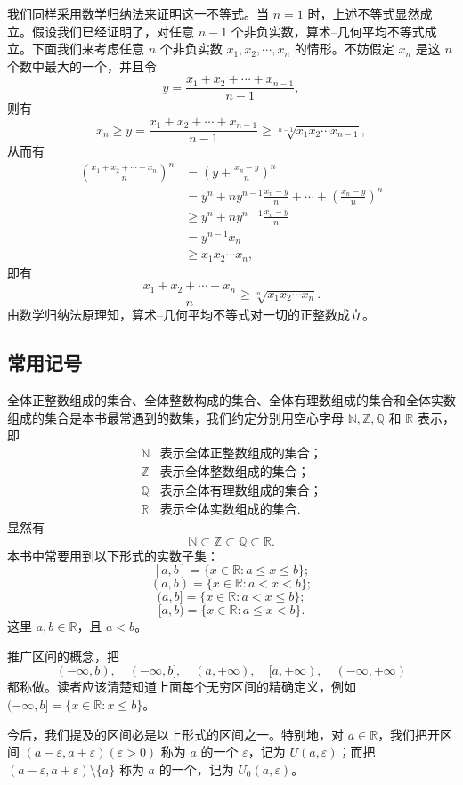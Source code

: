 \documentclass[UTF8,12pt,a4paper,fontset=fandol]{ctexbook}
\begin{document}
\noindent{}\quad 我们同样采用数学归纳法来证明这一不等式。当 $n=1$ 时，上述不等式显然成立。假设我们已经证明了，对任意 $n-1$ 个非负实数，算术--几何平均不等式成立。下面我们来考虑任意 $n$ 个非负实数 $x_1,x_2,\cdots,x_n$ 的情形。不妨假定 $x_n$ 是这 $n$ 个数中最大的一个，并且令
\[
  y=\frac{x_1+x_2+\cdots+x_{n-1}}{n-1},
\]
则有
\[
  x_n\ge y=\frac{x_1+x_2+\cdots+x_{n-1}}{n-1}
  \ge \sqrt[n-1]{x_1x_2\cdots x_{n-1}},
\]
从而有
\[
\begin{aligned}
  \left(\frac{x_1+x_2+\cdots+x_n}{n}\right)^n
  &=\left(y+\frac{x_n-y}{n}\right)^n\\
  &=y^n+ny^{n-1}\frac{x_n-y}{n}+\cdots+\left(\frac{x_n-y}{n}\right)^n\\
  &\ge y^n+ny^{n-1}\frac{x_n-y}{n}\\
  &=y^{n-1}x_n\\
  &\ge x_1x_2\cdots x_n,
\end{aligned}
\]
即有
\[
  \frac{x_1+x_2+\cdots+x_n}{n}\ge \sqrt[n]{x_1x_2\cdots x_n}.
\]
由数学归纳法原理知，算术--几何平均不等式对一切的正整数成立。

\subsection{常用记号}

全体正整数组成的集合、全体整数构成的集合、全体有理数组成的集合和全体实数组成的集合是本书最常遇到的数集，我们约定分别用空心字母 $\mathbb{N},\mathbb{Z},\mathbb{Q}$ 和 $\mathbb{R}$ 表示，即
\[
\begin{array}{ll}
  \mathbb{N} & \text{表示全体正整数组成的集合；}\\
  \mathbb{Z} & \text{表示全体整数组成的集合；}\\
  \mathbb{Q} & \text{表示全体有理数组成的集合；}\\
  \mathbb{R} & \text{表示全体实数组成的集合.}
\end{array}
\]
显然有
\[
  \mathbb{N}\subset\mathbb{Z}\subset\mathbb{Q}\subset\mathbb{R}.
\]
本书中常要用到以下形式的实数子集：
\[
  [a,b]=\{x\in\mathbb{R}:a\le x\le b\};
\]
\[
  (a,b)=\{x\in\mathbb{R}:a<x<b\};
\]
\[
  (a,b]=\{x\in\mathbb{R}:a<x\le b\};
\]
\[
  [a,b)=\{x\in\mathbb{R}:a\le x<b\}.
\]
这里 $a,b\in\mathbb{R}$，且 $a<b$。

推广区间的概念，把
\[
  (-\infty,b),\quad (-\infty,b],\quad (a,+\infty),\quad [a,+\infty),\quad (-\infty,+\infty)
\]
都称做。读者应该清楚知道上面每个无穷区间的精确定义，例如 $(-\infty,b]=\{x\in\mathbb{R}:x\le b\}$。

今后，我们提及的区间必是以上形式的区间之一。特别地，对 $a\in\mathbb{R}$，我们把开区间 $(a-\varepsilon,a+\varepsilon)(\varepsilon>0)$ 称为 $a$ 的一个 $\varepsilon$，记为 $U(a,\varepsilon)$；而把 $(a-\varepsilon,a+\varepsilon)\setminus\{a\}$ 称为 $a$ 的一个，记为 $U_0(a,\varepsilon)$。
\end{document}
